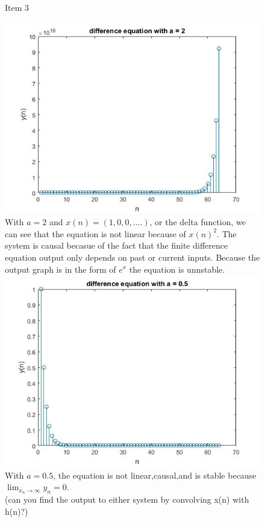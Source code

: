 \documentclass{article}
\begin{document}
\begin{figure}[H]
\Report Item 3

\includegraphics[scale = .5]{report3}
\\ With $a = 2$ and $x(n) = (1,0,0,....)$, or the delta function, we can see that the equation is not linear because of $x(n)^{2}$. The system is causal becasue of the fact that the finite difference equation output only depends on past or current inputs. Because the output graph is in the form of $e^x$ the equation is unnstable.
\includegraphics[scale = .5]{report3_2}
\\ With $a = 0.5$, the equation is not linear,causal,and is stable because $\lim_{x_n\to\infty} y_n = 0$.
\\ (can you find the output to either system by convolving x(n) with h(n)?)
\end{figure}
\end{document}
